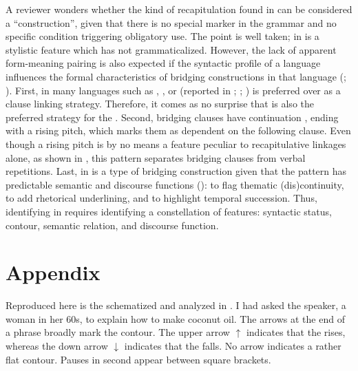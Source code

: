 \documentclass[output=paper]{LSP/langsci}
\begin{document}
A reviewer wonders whether the kind of recapitulation found in  can be considered a ``construction'', given that there is no special marker in the grammar and no specific condition triggering obligatory use. The point is well taken;  in  is a stylistic feature which has not grammaticalized. However, the lack of apparent form-meaning pairing is also expected if the syntactic profile of a language influences the formal characteristics of bridging constructions in that language (\citealt{devries.2005}; \citealt[][898]{seifart10}). First, in many  languages such as , ,  or  (reported in \citealt{bril10}; \citealt{Lichtenberk83}; \citealt[][53]{lynch02})  is preferred over  as a clause linking strategy.  Therefore, it comes as no surprise that  is also the preferred strategy for the . Second, bridging clauses have continuation , ending with a rising pitch, which marks them as dependent on the following clause. Even though a rising pitch is by no means a feature peculiar to recapitulative linkages alone, as shown in , this  pattern separates bridging clauses from verbal repetitions. Last,  in  is a type of bridging construction given that the pattern has predictable semantic and discourse functions (): to flag thematic (dis)continuity, to add rhetorical underlining, and to highlight temporal succession. Thus, identifying  in  requires identifying a constellation of features: syntactic status,  contour, semantic relation, and discourse function.

 \section*{Appendix}
 \setcounter{equation}{0}
Reproduced here is the  schematized and analyzed in . I had asked the speaker, a woman in her 60s, to explain how to make coconut oil. The arrows at the end of a phrase broadly mark the  contour. The upper arrow $\uparrow$ indicates that the  rises, whereas the down arrow $\downarrow$  indicates that the  falls. No arrow indicates a rather flat  contour. Pauses in second appear between square brackets.
 
\end{document}
